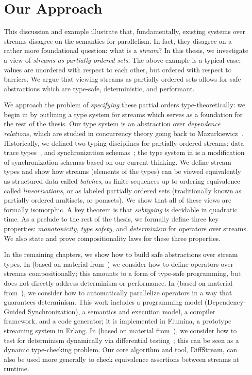 \section{Our Approach}

This discussion and example illustrate that, fundamentally, existing systems over streams disagree on the semantics for parallelism.
In fact, they disagree on a rather more foundational question: what is a \emph{stream}?
In this thesis, we investigate a view of \emph{streams as partially ordered sets}.
The above example is a typical case: values are unordered with respect to each other, but ordered with respect to barriers.
We argue that viewing streams as partially ordered sets allows for safe abstractions which are type-safe, deterministic, and performant.

We approach the problem of \emph{specifying} these partial orders type-theoretically: we begin in  by
outlining a type system for streams which serves as a foundation for the rest of the thesis.
Our type system is an abstraction over \emph{dependence relations},
which are studied in concurrency theory going back to Mazurkiewicz~\cite{mazurkiewicz1986trace}.
Historically, we defined two typing disciplines for partially ordered streams:
data-trace types~,
and synchronization schemas~;
the type system in  is a modification of synchronization schemas based on our current thinking.
We define stream types and show how streams (elements of the types) can be viewed equivalently as structured data called \emph{batches}, as finite sequences up to ordering equivalence called \emph{linearizations}, or as labeled partially ordered sets (traditionally known as partially ordered multisets, or pomsets).
We show that all of these views are formally isomorphic.
A key theorem is that \emph{subtyping} is decidable in quadratic time.
As a prelude to the rest of the thesis, we formally define three key properties: \emph{monotonicity}, \emph{type safety}, and \emph{determinism} for operators over streams.
We also state and prove compositionality laws for these three properties.

In the remaining chapters, we show how to build safe abstractions over stream types.
In  (based on material from~) we consider how to define operators over streams compositionally; this amounts to a form of type-safe programming, but does not directly address determinism or performance.
In  (based on material from~), we consider how to automatically parallelize operators in a way that guarantees determinism. This work includes a programming model (Dependency-Guided Synchronization), a semantics and execution model, a compiler framework, and a code generator; it is implemented in Flumina, a prototype streaming system in Erlang.
In  (based on material from~), we
consider how to test for determinism dynamically via differential testing~\cite{mckeeman1998differential}; this can be seen as a dynamic
type-checking problem. Our core algorithm and tool, DiffStream, can also be used more generally to check equivalence assertions between streams at runtime.

